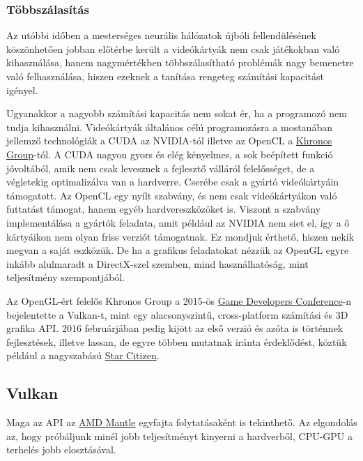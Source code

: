 \subsubsection{T\"obbsz\'alas\'it\'as}

Az ut\'obbi id\H oben a mesters\'eges neur\'alis h\'al\'ozatok \'ujb\'oli fellend\"ul\'es\'enek k\"osz\"onhet\H oen jobban el\H ot\'erbe ker\"ult a vide\'ok\'arty\'ak nem csak j\'at\'ekokban val\'o kihaszn\'al\'asa, hanem nagym\'ert\'ekben t\"obbsz\'alas\'ithat\'o probl\'em\'ak nagy bemenetre val\'o felhaszn\'al\'asa, hiszen ezeknek a tan\'it\'asa rengeteg sz\'am\'it\'asi kapacit\'ast ig\'enyel.

Ugyanakkor a nagyobb sz\'am\'it\'asi kapacit\'as nem sokat \'er, ha a programoz\'o nem tudja kihaszn\'alni.
Vide\'ok\'arty\'ak \'altal\'anos c\'el\'u programoz\'asra a mostan\'aban jellemz\H o technol\'ogi\'ak a CUDA az NVIDIA-t\'ol illetve az OpenCL a \href{https://www.khronos.org/}{Khronos Group}-t\'ol. A CUDA nagyon gyors \'es el\'eg k\'enyelmes, a sok be\'ep\'itett funkci\'o j\'ovolt\'ab\'ol, amik nem csak levesznek a fejleszt\H o v\'all\'ar\'ol felel\H oss\'eget, de a v\'egletekig optimaliz\'alva van a hardverre. Cser\'ebe csak a gy\'art\'o vide\'ok\'arty\'ain t\'amogatott.
Az OpenCL egy ny\'ilt szabv\'any, \'es nem csak vide\'ok\'arty\'akon val\'o futtat\'ast t\'amogat, hanem egy\'eb hardvereszk\"oz\"oket is. Viszont a szabv\'any implement\'al\'asa a gy\'art\'ok feladata, amit p\'eld\'aul az NVIDIA nem siet el, \'igy a \H o k\'arty\'aikon nem olyan friss verzi\'ot t\'amogatnak. Ez mondjuk \'erthet\H o, hiszen nekik megvan a saj\'at eszk\"oz\"uk.
De ha a grafikus feladatokat n\'ezz\"uk az OpenGL egyre ink\'abb alulmaradt a DirectX-szel szemben, mind haszn\'alhat\'os\'ag, mint teljes\'itm\'eny szempontj\'ab\'ol.

Az OpenGL-\'ert felel\H os Khronos Group a 2015-\"os \href{http://www.gdconf.com/}{Game Developers Conference}-n bejelentette a Vulkan-t, mint egy alacsonyszint\H u, cross-platform sz\'am\'it\'asi \'es 3D grafika API.
2016 febru\'arj\'aban pedig kij\"ott az els\H o verzi\'o \'es az\'ota is t\"ort\'ennek fejleszt\'esek, illetve lassan, de egyre t\"obben mutatnak ir\'anta \'erdekl\H od\'est, k\"ozt\"uk p\'eld\'aul a nagyszab\'as\'u \href{https://robertsspaceindustries.com/star-citizen}{Star Citizen}.

\subsection{Vulkan}
Maga az API az \href{https://www.amd.com/en-us/innovations/software-technologies/mantle}{AMD Mantle} egyfajta folytat\'asak\'ent is tekinthet\H o. Az elgondol\'as az, hogy pr\'ob\'aljunk min\'el jobb teljes\'itm\'enyt kinyerni a hardverb\H ol, CPU-GPU a terhel\'es jobb eloszt\'as\'aval.

